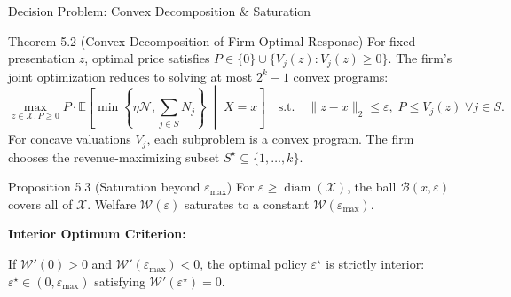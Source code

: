 \documentclass[aspectratio=169, 11pt, t, xcolor=table]{beamer}
\newcommand{\E}{\mathbb{E}}
\begin{document}
\begin{frame}{Decision Problem: Convex Decomposition \& Saturation}
\small
\begin{block}{Theorem 5.2 (Convex Decomposition of Firm Optimal Response)}
\footnotesize
For fixed presentation $z$, optimal price satisfies $P \in \{0\} \cup \{V_j(z) : V_j(z) \ge 0\}$.
The firm's joint optimization reduces to solving at most $2^k - 1$ convex programs:
\[
  \max_{z \in \mathcal{X}, P \ge 0} P \cdot \E\left[\min\!\left\{\eta\mathcal{N}, \sum_{j \in S} N_j\right\} \;\middle|\; X=x\right] \quad \text{s.t.} \quad \|z - x\|_2 \le \varepsilon, \; P \le V_j(z) \; \forall j \in S.
\]
For concave valuations $V_j$, each subproblem is a convex program. The firm chooses the revenue-maximizing subset $S^\star \subseteq \{1, \dots, k\}$.
\end{block}

\vspace{0.15em}
\begin{block}{Proposition 5.3 (Saturation beyond $\varepsilon_{\max}$)}
\footnotesize
For $\varepsilon \ge \operatorname{diam}(\mathcal{X})$, the ball $\mathcal{B}(x, \varepsilon)$ covers all of $\mathcal{X}$. Welfare $\mathcal{W}(\varepsilon)$ saturates to a constant $\mathcal{W}(\varepsilon_{\max})$.
\end{block}

\vspace{0.1em}
\textbf{Interior Optimum Criterion:}\par
If $\mathcal{W}'(0) > 0$ and $\mathcal{W}'(\varepsilon_{\max}) < 0$, the optimal policy $\varepsilon^\star$ is strictly interior:
$\varepsilon^\star \in (0, \varepsilon_{\max})$ satisfying $\mathcal{W}'(\varepsilon^\star) = 0$.
\end{frame}
\end{document}
